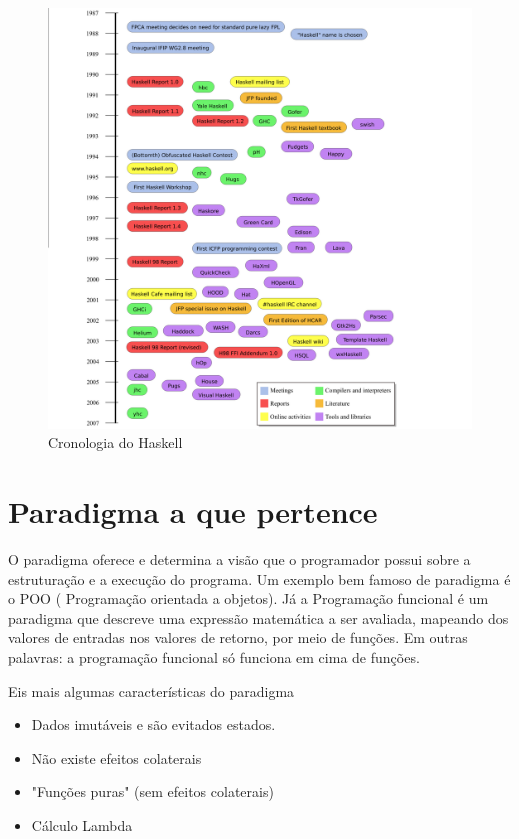 \documentclass[
	article,			%
	11pt,				%
	oneside,			%
	a4paper,			%
	english,			%
	brazil,				%
	sumario=tradicional
	]{abntex2}
\begin{document}
    \begin{figure}[ht]
      \includegraphics[width =\textwidth]{timeline.png}
      \caption{Cronologia do Haskell}
    \end{figure}

    \chapter{Paradigma a que pertence}

    O paradigma oferece e determina a visão que o programador possui sobre a estruturação
    e a execução do programa. Um exemplo bem famoso de paradigma é o POO ( Programação orientada a objetos).
    Já a Programação funcional é um paradigma que descreve uma expressão matemática a ser avaliada,
    mapeando dos valores de entradas nos valores de retorno, por meio de funções. Em outras palavras: 
    a programação funcional só funciona em cima de funções.

    Eis mais algumas características do paradigma
    \begin{itemize}
      \item Dados imutáveis e são evitados estados. 
      \item Não existe efeitos colaterais 
      \item "Funções puras" (sem efeitos colaterais)
      \item Cálculo Lambda
    \end{itemize}
\end{document}
